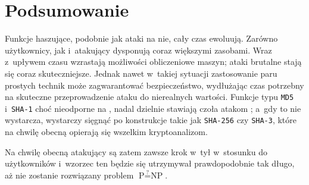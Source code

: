 \section{Podsumowanie}
Funkcje haszujące, podobnie jak ataki na nie, cały czas ewoluują. Zarówno
użytkownicy, jak i~atakujący dysponują coraz większymi zasobami. Wraz z~upływem
czasu wzrastają możliwości obliczeniowe maszyn; ataki brutalne stają się coraz
skuteczniejsze. Jednak nawet w~takiej sytuacji zastosowanie paru prostych
technik może zagwarantować bezpieczeństwo, wydłużając czas potrzebny na
skuteczne przeprowadzenie ataku do nierealnych wartości. Funkcje typu
\texttt{MD5} i~\texttt{SHA-1} choć nieodporne na , nadal
dzielnie stawiają czoła atakom ; a~gdy to nie wystarcza, wystarczy
sięgnąć po konstrukcje takie jak \texttt{SHA-256} czy \texttt{SHA-3}, które na
chwilę obecną opierają się wszelkim kryptoanalizom.

Na chwilę obecną atakujący są zatem zawsze krok w~tył w~stosunku do
użytkowników i~wzorzec ten będzie się utrzymywał prawdopodobnie tak długo, aż
nie zostanie rozwiązany problem $\textrm{P} \stackrel{?}{=} \textrm{NP}$.
